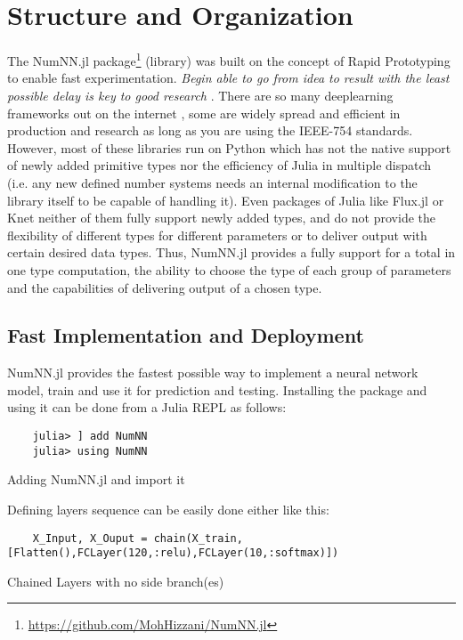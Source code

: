 \section{Structure and Organization}

The NumNN.jl  package\footnote{\url{https://github.com/MohHizzani/NumNN.jl}} (library) was built on the concept of Rapid Prototyping to enable fast experimentation. \emph{Begin able to go from idea to result with the least possible delay is key to good research} \cite{Keras}. There are so many deeplearning frameworks out on the internet \cite{Abadi2016,Collet2015,Jia2014,Paszke2017,PyTorch2019}, some are widely spread and efficient in production and research as long as you are using the IEEE-754 standards. However, most of these libraries run on Python which has not the native support of newly added primitive types nor the efficiency of Julia in multiple dispatch (i.e. any new defined number systems needs an internal modification to the library itself to be capable of handling it). Even packages of Julia like Flux.jl \cite{Flux.jl-2018,Innes2018} or Knet \cite{Yuret2016k} neither of them fully support newly added types, and do not provide the flexibility of different types for different parameters or to deliver output with certain desired data types. Thus, NumNN.jl provides a fully support for a total in one type computation, the ability to choose the type of each group of parameters and the capabilities of delivering output of a chosen type.

\subsection{Fast Implementation and Deployment}

NumNN.jl provides the fastest possible way to implement a neural network model, train and use it for prediction and testing. Installing the package and using it can be done from a Julia REPL as follows:

\begin{listing}[H]
	\begin{verbatim}
	julia> ] add NumNN
	julia> using NumNN
	\end{verbatim}
	\caption{Adding NumNN.jl and import it}\label{addimport}
\end{listing}

Defining layers sequence can be easily done either like this:

\begin{listing}[H]
	\begin{verbatim}
	X_Input, X_Ouput = chain(X_train,[Flatten(),FCLayer(120,:relu),FCLayer(10,:softmax)])
	\end{verbatim}
	\caption{Chained Layers with no side branch(es)}\label{chain}
\end{listing}



